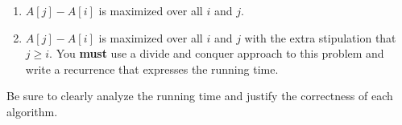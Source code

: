\documentclass[11pt]{article}
\begin{document}
\begin{enumerate}[1.]
\begin{enumerate}
\item $A[j] - A[i]$ is maximized over all $i$ and $j$.  
\item $A[j] - A[i]$ is maximized over all $i$ and $j$ with the extra stipulation that $j \geq i$.  You \textbf{must} use a divide and conquer approach to this problem and write a recurrence that expresses the running time.  
\end{enumerate}

Be sure to clearly analyze the running time and justify the correctness of each algorithm. 

\end{enumerate}
\end{document}
